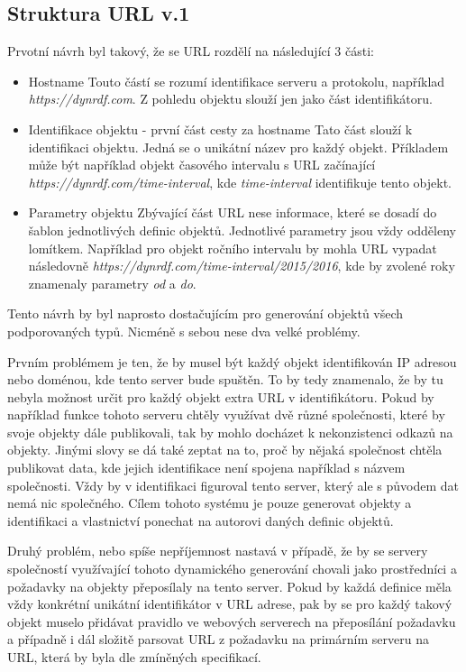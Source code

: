 \documentclass[thesis=B,czech]{FITthesis}[2012/06/26]
\begin{document}
 \subsection{Struktura URL v.1}
 Prvotní návrh byl takový, že se URL rozdělí na následující 3 části:
 \begin{itemize}
  \item Hostname
   \subitem Touto částí se rozumí identifikace serveru a protokolu, například \textit{https://dynrdf.com}. Z pohledu objektu slouží jen jako část identifikátoru.

    \item Identifikace objektu - první část cesty za hostname
     \subitem Tato část slouží k identifikaci objektu. Jedná se o unikátní název pro každý objekt. Příkladem může být například objekt časového intervalu s URL začínající 
     \textit{https://dynrdf.com/time-interval}, kde \textit{time-interval} identifikuje tento objekt.
     
    \item Parametry objektu
     \subitem Zbývající část URL nese informace, které se dosadí do šablon jednotlivých definic objektů. Jednotlivé parametry jsou vždy odděleny lomítkem.
     Například pro objekt ročního intervalu by mohla URL vypadat následovně \textit{https://dynrdf.com/time-interval/2015/2016}, kde by zvolené roky znamenaly 
     parametry \textit{od} a \textit{do}.
 \end{itemize}
 Tento návrh by byl naprosto dostačujícím pro generování objektů všech podporovaných typů. Nicméně s sebou nese dva velké problémy.
 
 Prvním problémem je ten, že by musel být každý objekt identifikován IP adresou nebo doménou, kde tento server bude spuštěn. To by tedy znamenalo, že
 by tu nebyla možnost určit pro každý objekt extra URL v identifikátoru. Pokud by například funkce tohoto serveru chtěly využívat dvě různé společnosti, které
 by svoje objekty dále publikovali, tak by mohlo docházet k nekonzistenci odkazů na objekty. Jinými slovy se dá také zeptat na to, proč by nějaká společnost chtěla 
 publikovat data, kde jejich identifikace není spojena například s názvem společnosti. Vždy by v identifikaci figuroval tento server, který ale s původem dat nemá
 nic společného. Cílem tohoto systému je pouze generovat objekty a identifikaci a vlastnictví ponechat na autorovi daných definic objektů.
 
 Druhý problém, nebo spíše nepříjemnost nastavá v případě, že by se servery společností využívající tohoto dynamického generování chovali jako prostředníci 
 a požadavky na objekty přeposílaly na tento server. Pokud by každá definice měla vždy konkrétní unikátní identifikátor v URL adrese, pak by se pro každý takový objekt 
 muselo přidávat pravidlo ve webových serverech na přeposílání požadavku a případně i dál složitě parsovat URL z požadavku na primárním serveru na URL, která by byla 
 dle zmíněných specifikací.
 
\end{document}
